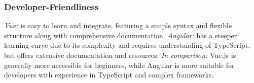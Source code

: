 \documentclass[conference]{IEEEtran}
\begin{document}



\subsubsection{Developer-Friendliness}

\textit{Vue:} is easy to learn and integrate, featuring a simple syntax and flexible structure along with comprehensive documentation.
\newline\textit{Angular:} has a steeper learning curve due to its complexity and requires understanding of TypeScript, but offers extensive documentation and resources.
\newline\textit{In comparison:} Vue.js is generally more accessible for beginners, while Angular is more suitable for developers with experience in TypeScript and complex frameworks.


\end{document}
